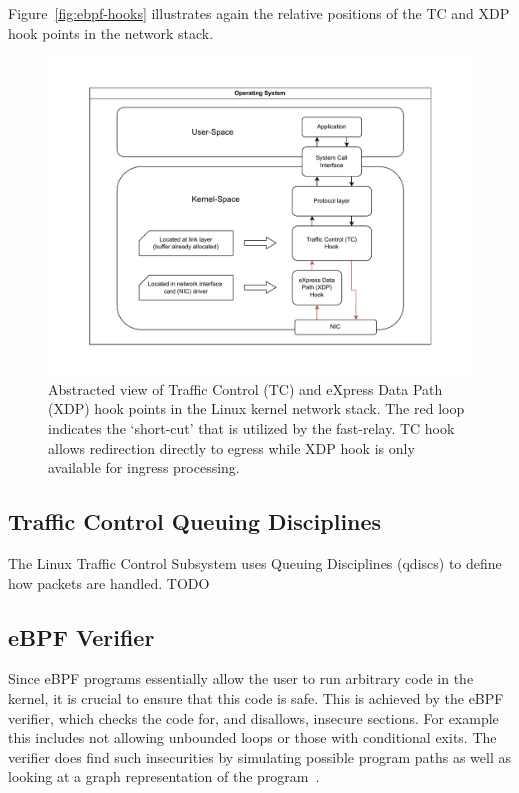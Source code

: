 Figure~\autoref{fig:ebpf-hooks} illustrates again the relative positions of the TC and
XDP hook points in the network stack.

\begin{figure}[htbp]
    \centering
    \includegraphics[width=\textwidth]{figures/02_background/ebpf-hooks.drawio.pdf}
    \caption{Abstracted view of Traffic Control (TC) and eXpress Data Path (XDP) hook points
    in the Linux kernel network stack.
    The red loop indicates the `short-cut' that is utilized by the fast-relay.
    TC hook allows redirection directly to egress while XDP hook is only available
    for ingress processing.
    }\label{fig:ebpf-hooks}
\end{figure}

\subsection{Traffic Control Queuing Disciplines}
The Linux Traffic Control Subsystem uses Queuing Disciplines (qdiscs) to define how packets
are handled. TODO

\subsection{eBPF Verifier}
Since eBPF programs essentially allow the user to run arbitrary code in the kernel,
it is crucial to ensure that this code is safe.
This is achieved by the eBPF verifier, which checks the code for, and disallows,
insecure sections.
For example this includes not allowing unbounded loops or those with conditional exits.
The verifier does find such insecurities by simulating possible program paths as well as 
looking at a graph representation of the program~\parencite{ebpf-verifier}.

